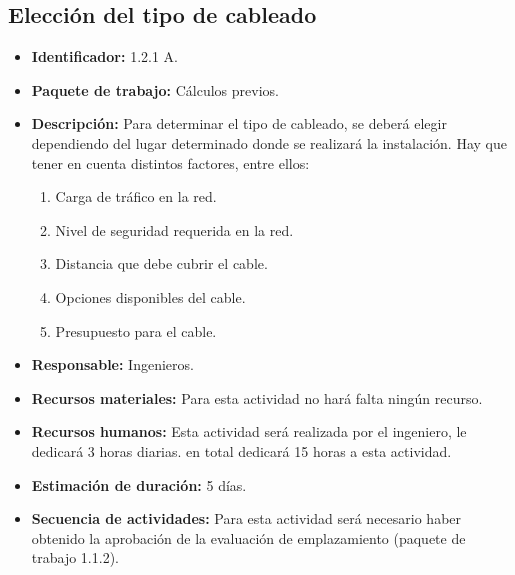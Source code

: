 \subsection{Elección del tipo de cableado}
\begin{itemize}
\item \textbf{Identificador: }1.2.1 A.
\item \textbf{Paquete de trabajo: }Cálculos previos.
\item \textbf{Descripción: }Para determinar el tipo de cableado, se deberá elegir dependiendo del lugar determinado donde se realizará la instalación. Hay que tener en cuenta distintos factores, entre ellos:
\begin{enumerate}
\item Carga de tráfico en la red.
\item Nivel de seguridad requerida en la red.
\item Distancia que debe cubrir el cable.
\item Opciones disponibles del cable.
\item Presupuesto para el cable.
\end{enumerate}
\item \textbf{Responsable: }Ingenieros.
\item \textbf{Recursos materiales: }Para esta actividad no hará falta ningún recurso.
\item \textbf{Recursos humanos: }Esta actividad será realizada por el ingeniero, le dedicará 3 horas diarias. en total dedicará 15 horas a esta actividad.
\item \textbf{Estimación de duración: }5 días.
\item \textbf{Secuencia de actividades: }Para esta actividad será necesario haber obtenido la aprobación de la evaluación de emplazamiento (paquete de trabajo 1.1.2).
\end{itemize}

